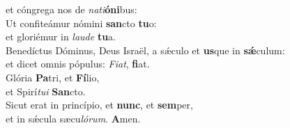 \oddverse et cóngrega nos de \textit{na}\textit{ti}\textbf{ó}\textbf{ni}bus:\\
\evenverse Ut confiteámur nómini \textbf{san}cto \textbf{tu}o:~\*\\
\evenverse et gloriémur in \textit{lau}\textit{de} \textbf{tu}a.\\
\oddverse Benedíctus Dóminus, Deus Israël, a sǽculo et \textbf{us}que in \textbf{sǽ}culum:~\*\\
\oddverse et dicet omnis pópulus: \textit{Fi}\textit{at}, \textbf{fi}at.\\
\evenverse Glória \textbf{Pa}tri, et \textbf{Fí}lio,~\*\\
\evenverse et Spirí\textit{tu}\textit{i} \textbf{San}cto.\\
\oddverse Sicut erat in princípio, et \textbf{nunc}, et \textbf{sem}per,~\*\\
\oddverse et in sǽcula sæcu\textit{ló}\textit{rum}. \textbf{A}men.\\
